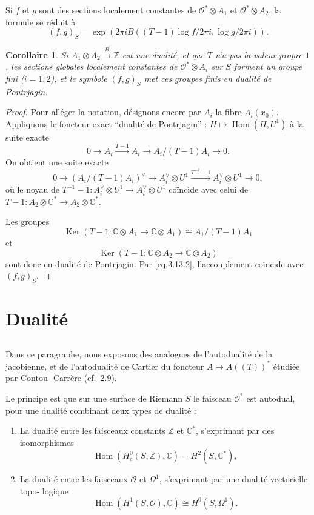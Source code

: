 \documentclass[12pt,a4paper]{article}
\theoremstyle{plain}
\newtheorem{corollary}[theorem]{Corollaire}
\theoremstyle{definition}
\theoremstyle{remark}
\DeclareMathOperator{\Ker}{Ker}
\DeclareMathOperator{\Hom}{Hom}
\newcommand{\cO}{\mathcal{O}}
\newcommand{\Z}{\mathbb{Z}}
\newcommand{\C}{\mathbb{C}}
\providecommand{\cO}{\mathcal{O}}
\providecommand{\Hom}{\operatorname{Hom}}
\providecommand{\Ker}{\operatorname{Ker}}
\begin{document}
Si $f$ et $g$ sont des sections localement constantes de $\cO^* \otimes A_1$ et $\cO^* \otimes A_2$, la formule
se réduit à
\begin{equation}\label{eq:3.13.2}
(f, g)_S = \exp(2\pi i B((T - 1)\log f / 2\pi i, \log g / 2\pi i)).
\end{equation}

\begin{corollary}
Si $A_1 \otimes A_2 \xrightarrow{B} \Z$ est une dualité, et que $T$ n'a pas la valeur propre $1$, les
sections globales localement constantes de $\cO^* \otimes A_i$ sur $S$ forment un groupe fini ($i = 1, 2$), et le
symbole $(f,g)_S$ met ces groupes finis en dualité de Pontrjagin.
\end{corollary}

\begin{proof}
Pour alléger la notation, désignons encore par $A_i$ la fibre $A_i(x_0)$. Appliquons le foncteur exact ``dualité de Pontrjagin'' : $H \mapsto \Hom(H, U^1)$ à la suite exacte
\[
0 \to A_i \xrightarrow{T-1} A_i \to A_i/(T-1)A_i \to 0.
\]
On obtient une suite exacte
\[
0 \to (A_i/(T-1)A_i)^\vee \to A_i^\vee \otimes U^1 \xrightarrow{T^{-1}-1} A_i^\vee \otimes U^1 \to 0,
\]
où le noyau de $T^{-1} - 1 : A_i^\vee \otimes U^1 \to A_i^\vee \otimes U^1$ coïncide avec celui de
$T - 1 : A_2 \otimes \C^* \to A_2 \otimes \C^*$.

Les groupes
\[
\Ker(T - 1 : \C \otimes A_1 \to \C \otimes A_1) \cong A_1/(T-1)A_1
\]
et
\[
\Ker(T - 1 : \C \otimes A_2 \to \C \otimes A_2)
\]
sont donc en dualité de Pontrjagin. Par \eqref{eq:3.13.2}, l'accouplement coïncide avec $(f,g)_S$.
\end{proof}

\section{Dualité}

\subsection{}

Dans ce paragraphe, nous exposons des analogues de l'autodualité de la
jacobienne, et de l'autodualité de Cartier du foncteur $A \mapsto A((T))^*$ étudiée par Contou-
Carrère (cf.~2.9).

Le principe est que sur une surface de Riemann $S$ le faisceau $\cO^*$ est autodual,
pour une dualité combinant deux types de dualité :
\begin{enumerate}[label=\alph*)]
\item La dualité entre les faisceaux constants $\Z$ et $\C^*$, s'exprimant par des isomorphismes
\[
\Hom(H^0_c(S, \Z), \C) = H^2(S, \C^*),
\]
\item La dualité entre les faisceaux $\cO$ et $\Omega^1$, s'exprimant par une dualité vectorielle topo-
logique
\[
\Hom(H^1(S, \cO), \C) \cong H^0(S, \Omega^1).
\]
\end{enumerate}
\end{document}
